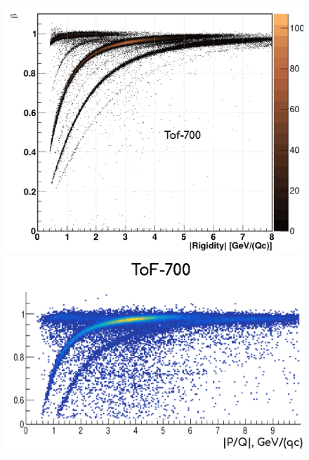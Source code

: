 \documentclass[dvipsnames] {beamer}
\begin{document}
\begin{frame}
\begin{columns}[t]
\begin{block}{}
\begin{figure}[H]
         \includegraphics[width=1.\linewidth]{pid_tof700_sim.png} \\
         \includegraphics[width=1.\linewidth]{pid_exp_tof700.png}
       \end{figure}
    \end{block}   
  \end{columns}
  
\end{frame}
\end{document}

